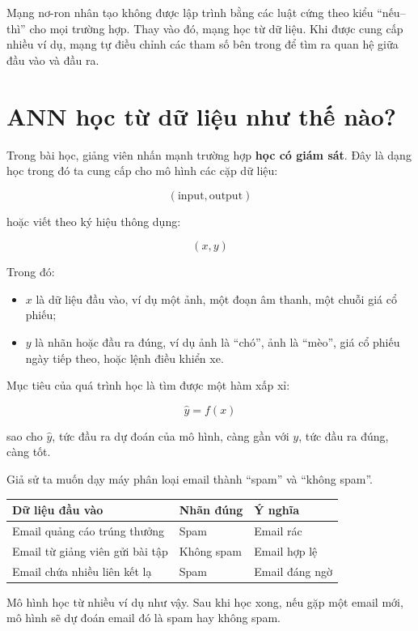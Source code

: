 \documentclass[12pt,a4paper]{report}
\begin{document}
\begin{ghinho}
Mạng nơ-ron nhân tạo không được lập trình bằng các luật cứng theo kiểu ``nếu--thì'' cho mọi trường hợp. Thay vào đó, mạng học từ dữ liệu. Khi được cung cấp nhiều ví dụ, mạng tự điều chỉnh các tham số bên trong để tìm ra quan hệ giữa đầu vào và đầu ra.
\end{ghinho}

\section{ANN học từ dữ liệu như thế nào?}

Trong bài học, giảng viên nhấn mạnh trường hợp \textbf{học có giám sát}. Đây là dạng học trong đó ta cung cấp cho mô hình các cặp dữ liệu:

\[
    (\text{input}, \text{output})
\]

hoặc viết theo ký hiệu thông dụng:

\[
    (x, y)
\]

Trong đó:

\begin{itemize}
    \item $x$ là dữ liệu đầu vào, ví dụ một ảnh, một đoạn âm thanh, một chuỗi giá cổ phiếu;
    \item $y$ là nhãn hoặc đầu ra đúng, ví dụ ảnh là ``chó'', ảnh là ``mèo'', giá cổ phiếu ngày tiếp theo, hoặc lệnh điều khiển xe.
\end{itemize}

Mục tiêu của quá trình học là tìm được một hàm xấp xỉ:

\[
    \hat{y} = f(x)
\]

sao cho $\hat{y}$, tức đầu ra dự đoán của mô hình, càng gần với $y$, tức đầu ra đúng, càng tốt.

\begin{vidu}
Giả sử ta muốn dạy máy phân loại email thành ``spam'' và ``không spam''.

\begin{center}
\begin{tabular}{lll}
\toprule
Dữ liệu đầu vào & Nhãn đúng & Ý nghĩa \\
\midrule
Email quảng cáo trúng thưởng & Spam & Email rác \\
Email từ giảng viên gửi bài tập & Không spam & Email hợp lệ \\
Email chứa nhiều liên kết lạ & Spam & Email đáng ngờ \\
\bottomrule
\end{tabular}
\end{center}

Mô hình học từ nhiều ví dụ như vậy. Sau khi học xong, nếu gặp một email mới, mô hình sẽ dự đoán email đó là spam hay không spam.
\end{vidu}
\end{document}
